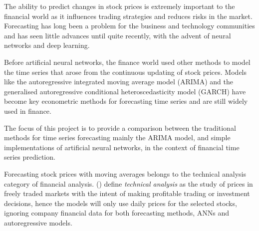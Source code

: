 The ability to predict changes in stock prices is extremely important to the financial world as it influences trading strategies and reduces risks in the market. Forecasting has long been a problem for the business and technology communities and has seen little advances until quite recently, with the advent of neural networks and deep learning.

Before artificial neural networks, the finance world used other methods to model the time series that arose from the continuous updating of stock prices. Models like the autoregressive integrated moving average model (ARIMA) and the generalised autoregressive conditional heteroscedasticity model (GARCH) have become key econometric methods for forecasting time series and are still widely used in finance.

The focus of this project is to provide a comparison between the traditional methods for time series forecasting mainly the ARIMA model, and simple implementations of artificial neural networks, in the context of financial time series prediction.

Forecasting stock prices with moving averages belongs to the technical analysis category of financial analysis. \citeauthor{tech_analysis} (\citeyear{tech_analysis}) define \textit{technical analysis} as the study of prices in freely traded markets with the intent of making profitable trading or investment decisions, hence the models will only use daily prices for the selected stocks, ignoring company financial data for both forecasting methods, ANNs and autoregressive models.

